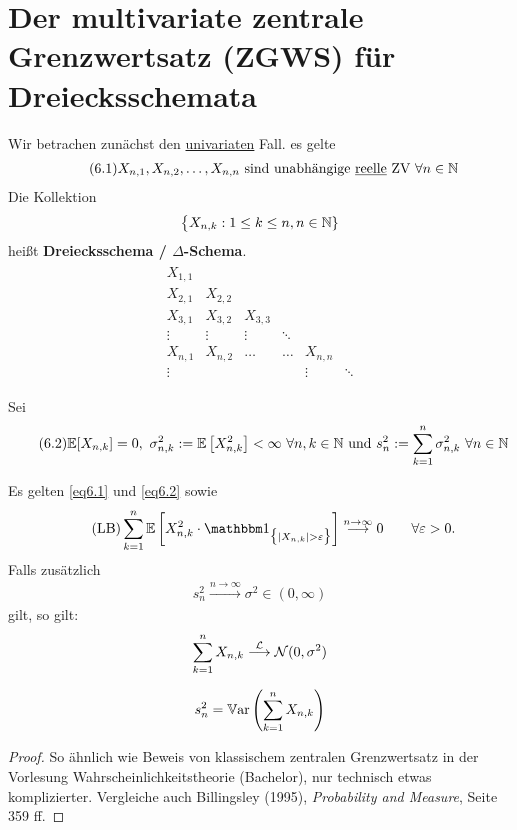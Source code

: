 \section{Der multivariate zentrale Grenzwertsatz (ZGWS) für Dreiecksschemata} %
Wir betrachen zunächst den \underline{univariaten} Fall. es gelte
\begin{align}\label{eq6.1}\tag{6.1}
X_{n,1},X_{n,2},\ldots,X_{n,n}\text{ sind unabhängige \underline{reelle} ZV }\forall n\in\mathbb{N}
\end{align}
Die Kollektion
\begin{align*}
\big\lbrace X_{n,k}:1\leq k\leq n,n\in\mathbb{N}\rbrace
\end{align*}
heißt \textbf{Dreiecksschema / $\Delta$-Schema}.
\begin{align*}
\begin{matrix}
X_{1,1}\\
X_{2,1} & X_{2,2}\\
X_{3,1} & X_{3,2} & X_{3,3}\\
\vdots & \vdots & \vdots & \ddots\\
X_{n,1} & X_{n,2} & \hdots & \hdots & X_{n,n}\\
\vdots &&&&\vdots & \ddots
\end{matrix}
\end{align*}

Sei 
\begin{align}\label{eq6.2}\tag{6.2}
\mathbb{E}[X_{n,k}]=0,~\sigma_{n,k}^2:=\mathbb{E}\left[X_{n,k}^2\right]<\infty~\forall n,k\in\mathbb{N}\text{ und }
s_n^2:=\sum\limits_{k=1}^n\sigma_{n,k}^2~\forall n\in\mathbb{N}
\end{align}

\begin{satz}[Lindeberg, 1922]\label{satz6.1Lindeberg1922}\enter
Es gelten \eqref{eq6.1} und \eqref{eq6.2} sowie
\begin{align}\label{eqSatz6.1LindebergLB}\tag{LB}
\sum\limits_{k=1}^n\E\left[X_{n,k}^2\cdot\indi_{\big\lbrace|X_{n,k}|>\varepsilon\big\rbrace}\right]\stackrel{n\to\infty}{\longrightarrow}0\qquad\forall\varepsilon>0.
\end{align}
Falls zusätzlich
\begin{align*}
s_n^2\stackrel{n\to\infty}{\longrightarrow}\sigma^2\in(0,\infty)
\end{align*}
gilt, so gilt:
\begin{align*}
\sum\limits_{k=1}^n X_{n,k}\stackrel{\mathcal{L}}{\longrightarrow}\mathcal{N}(0,\sigma^2)
\end{align*}
\end{satz}
\begin{bemerkung}
\begin{align*}
s_n^2=\mathbb{V}\text{ar}\left(\sum\limits_{k=1}^n X_{n,k}\right)
\end{align*}
\end{bemerkung}
\begin{proof}
So ähnlich wie Beweis von klassischem zentralen Grenzwertsatz in der Vorlesung Wahrscheinlichkeitstheorie (Bachelor), nur technisch etwas komplizierter. Vergleiche auch Billingsley (1995), \textit{Probability and Measure}, Seite 359 ff.
\end{proof}

